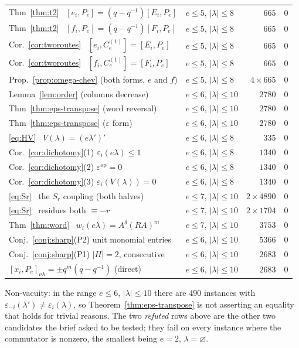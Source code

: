 \documentclass[11pt]{article}
\theoremstyle{plain}
\theoremstyle{definition}
\newcommand{\qq}{(q-q^{-1})}
\newcommand{\Ce}{C_e^{(1)}}
\begin{document}
\begin{center}
\begin{tabular}{llrr}
Thm~\ref{thm:t2} \ $[e_i,P_e]=\qq[E_i,P_e]$ & $e\le5$, $|\lambda|\le8$ & $665$ & $0$\\
Thm~\ref{thm:t2} \ $[f_i,P_e]=\qq[F_i,P_e]$ & $e\le5$, $|\lambda|\le8$ & $665$ & $0$\\
Cor.~\ref{cor:tworoutes} \ $[e_i,\Ce]=[E_i,P_e]$ & $e\le5$, $|\lambda|\le8$ & $665$ & $0$\\
Cor.~\ref{cor:tworoutes} \ $[f_i,\Ce]=[F_i,P_e]$ & $e\le5$, $|\lambda|\le8$ & $665$ & $0$\\
Prop.~\ref{prop:omega-chev} (both forms, $e$ and $f$) & $e\le5$, $|\lambda|\le8$ & $4\times665$ & $0$\\
\hline
Lemma~\ref{lem:order} (columns decrease) & $e\le6$, $|\lambda|\le10$ & $2780$ & $0$\\
Thm~\ref{thm:eps-transpose} (word reversal) & $e\le6$, $|\lambda|\le10$ & $2780$ & $0$\\
Thm~\ref{thm:eps-transpose} ($\varepsilon$ form) & $e\le6$, $|\lambda|\le10$ & $2780$ & $0$\\
\eqref{eq:HV} \ $V(\lambda)=(e\lambda')'$ & $e\le6$, $|\lambda|\le8$ & $335$ & $0$\\
Cor.~\ref{cor:dichotomy}(1) $\varepsilon_i(e\lambda)\le1$ & $e\le6$, $|\lambda|\le8$ & $1340$ & $0$\\
Cor.~\ref{cor:dichotomy}(2) $\varepsilon^{\mathrm{op}}=0$ & $e\le6$, $|\lambda|\le8$ & $1340$ & $0$\\
Cor.~\ref{cor:dichotomy}(3) $\varepsilon_i(V(\lambda))=0$ & $e\le6$, $|\lambda|\le8$ & $1340$ & $0$\\
\eqref{eq:Sr} \ the $S_r$ coupling (both halves) & $e\le7$, $|\lambda|\le10$ & $2\times4890$ & $0$\\
\eqref{eq:Sr} \ residues both $\equiv-r$ & $e\le7$, $|\lambda|\le10$ & $2\times1704$ & $0$\\
Thm~\ref{thm:word} \ $w_i(e\lambda)=A^\delta(RA)^m$ & $e\le7$, $|\lambda|\le10$ & $3753$ & $0$\\
\hline
Conj.~\ref{conj:sharp}(P2) unit monomial entries & $e\le6$, $|\lambda|\le10$ & $5366$ & $0$\\
Conj.~\ref{conj:sharp}(P1) $|H|=2$, consecutive & $e\le6$, $|\lambda|\le10$ & $2683$ & $0$\\
$[x_i,P_e]_{\nu\lambda}=\pm q^m\qq$ (direct) & $e\le6$, $|\lambda|\le10$ & $2683$ & $0$\\
\hline
\end{tabular}
\end{center}

Non-vacuity: in the range $e\le6$, $|\lambda|\le10$ there are $490$ instances
with $\varepsilon_{-i}(\lambda')\ne\varepsilon_i(\lambda)$, so
Theorem~\ref{thm:eps-transpose} is not asserting an equality that holds for
trivial reasons.  The two \emph{refuted} rows above are the other two
candidates the brief asked to be tested; they fail on every instance where the
commutator is nonzero, the smallest being $e=2$, $\lambda=\varnothing$.
\end{document}
